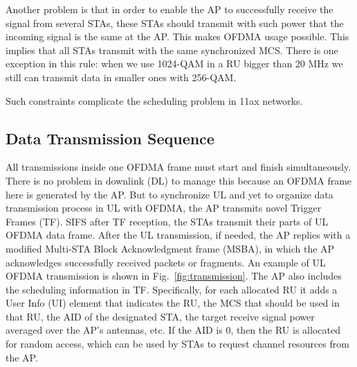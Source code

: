 Another problem is that in order to enable the AP to successfully receive the signal from several STAs, these STAs should transmit with such power that the incoming signal is the same at the AP.
This makes OFDMA usage possible. 
This implies that all STAs transmit with the same synchronized MCS. 
There is one exception in this rule: when we use 1024-QAM in a RU bigger than 20 MHz we still can transmit data in smaller ones with 256-QAM. 

Such constraints complicate the scheduling problem in 11ax networks.

\subsection{Data Transmission Sequence}

All transmissions inside one OFDMA frame must start and finish simultaneously. 
There is no problem in downlink (DL) to manage this because an OFDMA frame here is generated by the AP. 
But to synchronize UL and yet to organize data transmission process in UL with OFDMA, the AP transmits novel Trigger Frames (TF).
SIFS after TF reception, the STAs transmit their parts of UL OFDMA data frame. 
After the UL transmission, if needed, the AP replies with a modified Multi-STA
Block Acknowledgment frame (MSBA), in which the AP acknowledges successfully received packets or fragments.
An example of UL OFDMA transmission is shown in Fig.~\ref{fig:transmission}.
The AP also includes the scheduling information in TF.
Specifically, for each allocated RU it adds a User Info (UI) element that indicates the RU, the MCS that should be used in that RU, the AID of the designated STA, the target receive signal power averaged over the AP's antennas, etc. 
If the AID is $0$, then the RU is allocated for random access, which can be used by STAs to request channel resources from the AP.

